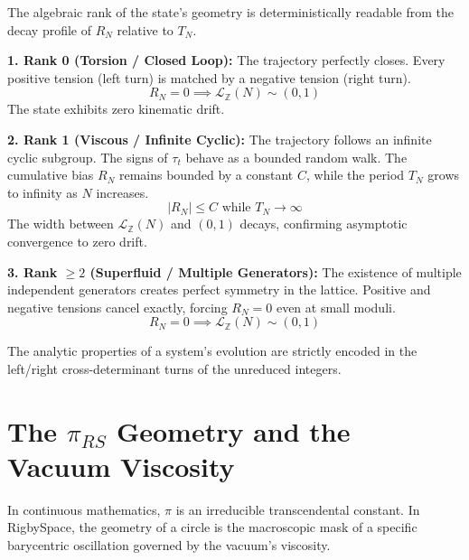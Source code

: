 \documentclass[11pt, letterpaper]{article}
\newcommand{\Z}{\mathbb{Z}}
\begin{document}
\begin{theorem}\label{thm:algebraic_rank}
\begin{rsbox}
The algebraic rank of the state's geometry is deterministically readable from the decay profile of $R_N$ relative to $T_N$.

\textbf{1. Rank 0 (Torsion / Closed Loop):}
The trajectory perfectly closes. Every positive tension (left turn) is matched by a negative tension (right turn).
\[ R_N = 0 \implies \mathcal{L}_{\Z}(N) \sim (0, 1) \]
The state exhibits zero kinematic drift.

\textbf{2. Rank 1 (Viscous / Infinite Cyclic):}
The trajectory follows an infinite cyclic subgroup. The signs of $\tau_t$ behave as a bounded random walk. The cumulative bias $R_N$ remains bounded by a constant $C$, while the period $T_N$ grows to infinity as $N$ increases.
\[ |R_N| \le C \text{ while } T_N \to \infty \]
The width between $\mathcal{L}_{\Z}(N)$ and $(0,1)$ decays, confirming asymptotic convergence to zero drift.

\textbf{3. Rank $\ge 2$ (Superfluid / Multiple Generators):}
The existence of multiple independent generators creates perfect symmetry in the lattice. Positive and negative tensions cancel exactly, forcing $R_N = 0$ even at small moduli.
\[ R_N = 0 \implies \mathcal{L}_{\Z}(N) \sim (0, 1) \]

The analytic properties of a system's evolution are strictly encoded in the left/right cross-determinant turns of the unreduced integers.
\end{rsbox}
\end{theorem}

\section{The $\pi_{RS}$ Geometry and the Vacuum Viscosity}

In continuous mathematics, $\pi$ is an irreducible transcendental constant. In RigbySpace, the geometry of a circle is the macroscopic mask of a specific barycentric oscillation governed by the vacuum's viscosity.
\end{document}
